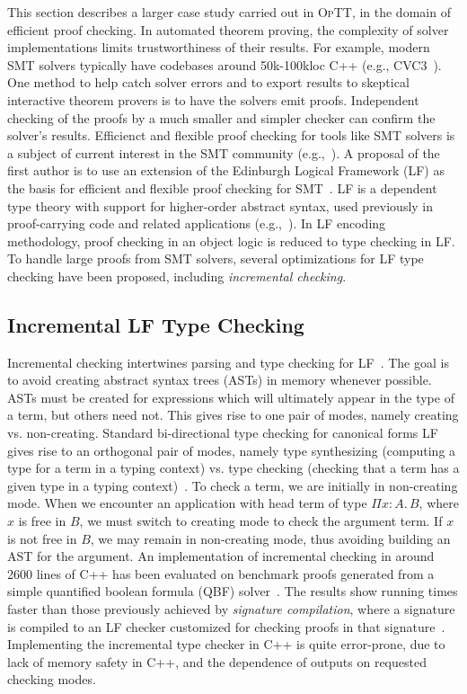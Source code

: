\documentclass[preprint,natbib]{sigplanconf}
\newcommand{\optt}{\textsc{OpTT}}
\begin{document}
This section describes a larger case study carried out in \optt, in
the domain of efficient proof checking.  In automated theorem proving,
the complexity of solver implementations limits trustworthiness of
their results.  For example, modern SMT solvers typically have
codebases around 50k-100kloc C++ (e.g., \textsc{CVC3}~\cite{BT07}).
One method to help catch solver errors and to export results to
skeptical interactive theorem provers is to have the solvers emit
proofs.  Independent checking of the proofs by a much smaller and
simpler checker can confirm the solver's results.  Efficienct and
flexible proof checking for tools like SMT solvers is a subject of
current interest in the SMT community (e.g.,~\cite{moskal08}).  A
proposal of the first author is to use an extension of the Edinburgh
Logical Framework (LF) as the basis for efficient and flexible proof
checking for SMT~\cite{SO08,HHP93}.  LF is a dependent type theory
with support for higher-order abstract syntax, used previously in
proof-carrying code and related applications (e.g.,~\cite{A01,N97}).
In LF encoding methodology, proof checking in an object logic is
reduced to type checking in LF.  To handle large proofs from SMT
solvers, several optimizations for LF type checking have been
proposed, including \emph{incremental checking}.

\subsection{Incremental LF Type Checking}

Incremental checking intertwines parsing and type checking for
LF~\cite{stump08b}.  The goal is to avoid creating abstract syntax
trees (ASTs) in memory whenever possible.  ASTs must be created for
expressions which will ultimately appear in the type of a term, but
others need not.  This gives rise to one pair of modes, namely
creating vs. non-creating.  Standard bi-directional type checking for
canonical forms LF gives rise to an orthogonal pair of modes, namely
type synthesizing (computing a type for a term in a typing context)
vs. type checking (checking that a term has a given type in a typing
context)~\cite{clf02,pierce98local}.  To check a term, we are
initially in non-creating mode.  When we encounter an application with
head term of type $\Pi x : A.\, B$, where $x$ is free in $B$, we must
switch to creating mode to check the argument term.  If $x$ is not
free in $B$, we may remain in non-creating mode, thus avoiding
building an AST for the argument.  An implementation of incremental
checking in around 2600 lines of C++ has been evaluated on benchmark
proofs generated from a simple quantified boolean formula (QBF)
solver~\cite{stump08b}.  The results show running times faster than
those previously achieved by \emph{signature compilation}, where a
signature is compiled to an LF checker customized for checking proofs
in that signature~\cite{zeller07}.  Implementing the incremental type
checker in C++ is quite error-prone, due to lack of memory safety in
C++, and the dependence of outputs on requested checking modes.
\end{document}
